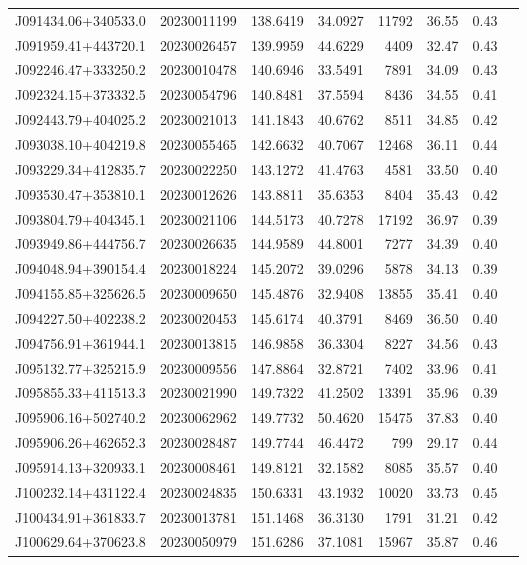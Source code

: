 \documentclass{article}
\begin{document}
\begin {longtable}{|l|l|r|r|r|r|r|l|}
 J091434.06+340533.0&  20230011199&  138.6419&   34.0927& 11792& 36.55& 0.43&\\
 J091959.41+443720.1&  20230026457&  139.9959&   44.6229&  4409& 32.47& 0.43&\\
 J092246.47+333250.2&  20230010478&  140.6946&   33.5491&  7891& 34.09& 0.43&\\
 J092324.15+373332.5&  20230054796&  140.8481&   37.5594&  8436& 34.55& 0.41&\\
 J092443.79+404025.2&  20230021013&  141.1843&   40.6762&  8511& 34.85& 0.42&\\
 J093038.10+404219.8&  20230055465&  142.6632&   40.7067& 12468& 36.11& 0.44&\\
 J093229.34+412835.7&  20230022250&  143.1272&   41.4763&  4581& 33.50& 0.40&\\
 J093530.47+353810.1&  20230012626&  143.8811&   35.6353&  8404& 35.43& 0.42&\\
 J093804.79+404345.1&  20230021106&  144.5173&   40.7278& 17192& 36.97& 0.39&\\
 J093949.86+444756.7&  20230026635&  144.9589&   44.8001&  7277& 34.39& 0.40&\\
 J094048.94+390154.4&  20230018224&  145.2072&   39.0296&  5878& 34.13& 0.39&\\
 J094155.85+325626.5&  20230009650&  145.4876&   32.9408& 13855& 35.41& 0.40&\\
 J094227.50+402238.2&  20230020453&  145.6174&   40.3791&  8469& 36.50& 0.40&\\
 J094756.91+361944.1&  20230013815&  146.9858&   36.3304&  8227& 34.56& 0.43&\\
 J095132.77+325215.9&  20230009556&  147.8864&   32.8721&  7402& 33.96& 0.41&\\
 J095855.33+411513.3&  20230021990&  149.7322&   41.2502& 13391& 35.96& 0.39&\\
 J095906.16+502740.2&  20230062962&  149.7732&   50.4620& 15475& 37.83& 0.40&\\
 J095906.26+462652.3&  20230028487&  149.7744&   46.4472&   799& 29.17& 0.44&\\
 J095914.13+320933.1&  20230008461&  149.8121&   32.1582&  8085& 35.57& 0.40&\\
 J100232.14+431122.4&  20230024835&  150.6331&   43.1932& 10020& 33.73& 0.45&\\
 J100434.91+361833.7&  20230013781&  151.1468&   36.3130&  1791& 31.21& 0.42&\\
 J100629.64+370623.8&  20230050979&  151.6286&   37.1081& 15967& 35.87& 0.46&\\

\end{longtable}
\end{document}
